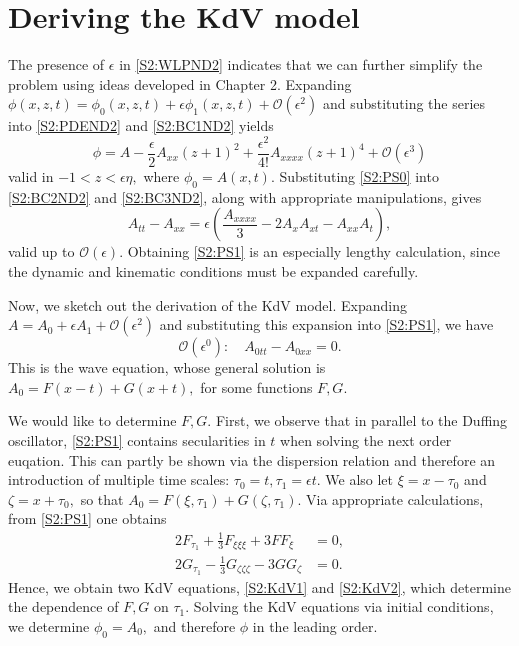 \section{Deriving the KdV model}
The presence of $\epsilon$ in \eqref{S2:WLPND2} indicates that we can further simplify the problem using ideas developed in Chapter 2. Expanding $\phi(x,z,t) = \phi_0(x,z,t) + \epsilon \phi_1(x,z,t) + \mathcal{O}(\epsilon^2)$ and substituting the series into \eqref{S2:PDEND2} and \eqref{S2:BC1ND2} yields
\begin{equation}\label{S2:PS0}
\phi = A - \frac{\epsilon}{2} A_{xx}(z+1)^2 + \frac{\epsilon^2}{4!} A_{xxxx} (z+1)^4 + \mathcal{O}(\epsilon^3)
\end{equation}
valid in $-1<z<\epsilon \eta,$ where $\phi_0 = A(x,t).$ Substituting \eqref{S2:PS0} into \eqref{S2:BC2ND2} and \eqref{S2:BC3ND2}, along with appropriate manipulations, gives
\begin{equation}\label{S2:PS1}
A_{tt} - A_{xx} = \epsilon\left( \frac{A_{xxxx}}{3} - 2A_x A_{xt} - A_{xx}A_t\right),
\end{equation}
valid up to $\mathcal{O}(\epsilon).$ Obtaining \eqref{S2:PS1} is an especially lengthy calculation, since the dynamic and kinematic conditions must be expanded carefully. 

Now, we sketch out the derivation of the KdV model. Expanding $A = A_0 + \epsilon A_1 + \mathcal{O}(\epsilon^2)$ and substituting this expansion into \eqref{S2:PS1}, we have 
\begin{equation}\label{S2:W1}
\mathcal{O}(\epsilon^0): \quad A_{0tt} - A_{0xx} = 0.
\end{equation} 
This is the wave equation, whose general solution is $A_0 = F(x-t) + G(x+t),$ for some functions $F,G.$

We would like to determine $F,G.$ First, we observe that in parallel to the Duffing oscillator, \eqref{S2:PS1} contains secularities in $t$ when solving the next order euqation. %
This can partly be shown via the dispersion relation and therefore an introduction of multiple time scales: $\tau_0 = t, \tau_1 = \epsilon t.$ We also let $\xi = x- \tau_0$ and $\zeta = x + \tau_0,$ so that $A_0 =  F(\xi, \tau_1) + G(\zeta, \tau_1).$ Via appropriate calculations, from \eqref{S2:PS1} one obtains 
\begin{align}
2F_{\tau_1} + \frac{1}{3}F_{\xi\xi\xi} + 3 F F_\xi &= 0, \label{S2:KdV1} \\
2G_{\tau_1} - \frac{1}{3}G_{\zeta\zeta\zeta} -  3 G G_\zeta &= 0. \label{S2:KdV2}
\end{align}
Hence, we obtain two KdV equations, \eqref{S2:KdV1} and \eqref{S2:KdV2}, which determine the dependence of $F, G$ on $\tau_1.$ Solving the KdV equations via initial conditions, we determine $\phi_0 = A_0,$ and therefore $\phi$ in the leading order.

